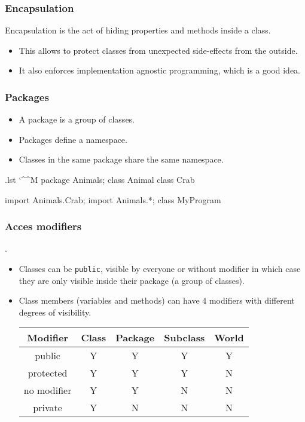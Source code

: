 \documentclass[10pt,handout]{beamer}
\makeatletter
\newenvironment{code}{%
  \begingroup
  \@bsphack
  \immediate\openout\lstvrb@out\jobname.lst
  \let\do\@makeother\dospecials\catcode`\^^M\active
  \def\verbatim@processline{%
    \immediate\write\lstvrb@out{\the\verbatim@line}}%
  \verbatim@start}{%
  \immediate\closeout\lstvrb@out
  \@esphack
  \endgroup
  
  \begin{alertblock}{}
    
  \end{alertblock}}
\makeatother
\begin{document}
\begin{frame}
  \frametitle{Encapsulation}
  \begin{definition}
  Encapsulation is the act of hiding properties and methods inside a class.
  \end{definition}
  \begin{itemize}
    \item This allows to protect classes from unexpected side-effects from the outside.
    \item It also enforces implementation agnostic programming, which is a good idea.
  \end{itemize}
\end{frame}

\begin{frame}[fragile]
  \frametitle{Packages}
  \begin{definition}
  \begin{itemize}
    \item A \alert{package} is a group of classes.
    \item Packages define a \alert{namespace}.
    \item Classes in the same package share the same \alert{namespace}. 
  \end{itemize}
  \end{definition}
  \begin{code}
    package Animals;
    class Animal{}
    class Crab{}

    import Animals.Crab;
    import Animals.*;
    class MyProgram{}
  \end{code}
\end{frame}

\begin{frame}[fragile]
  \frametitle{Acces modifiers}
  .
  \begin{itemize}
    \item Classes can be \alert{\verb!public!}, visible by everyone \newline
          or \alert{without modifier} in which case they are only visible inside their package (a group of classes).
    \item Class members (variables and methods) can have 4 modifiers with different degrees of visibility.
    \newline
    \begin{longtable}{|c|c|c|c|c|}
    \hline
    Modifier    & Class & Package & Subclass & World \\
    \hline
    public      & Y     & Y       & Y        & Y \\
    \hline
    protected   & Y     & Y       & Y        & N \\
    \hline
    no modifier & Y     & Y       & N        & N \\
    \hline
    private     & Y     & N       & N        & N \\
    \hline
    \end{longtable}
  \end{itemize}
\end{frame}
\end{document}
